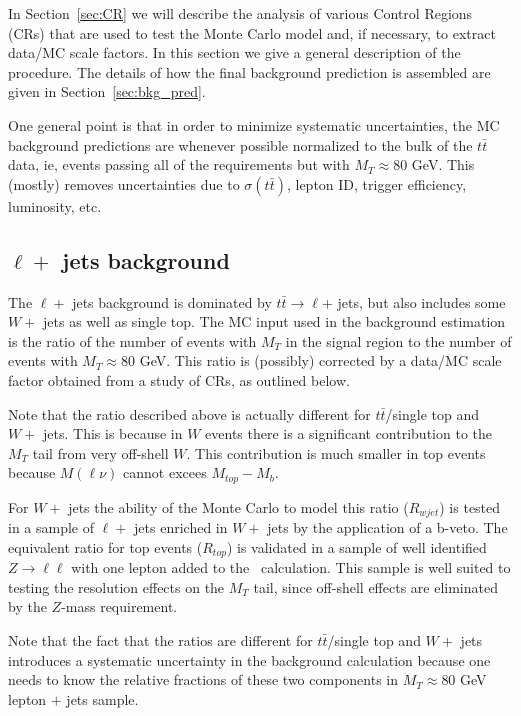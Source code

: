 In Section~\ref{sec:CR} we will describe the analysis of various Control Regions
(CRs)  that are used to test the Monte Carlo model and, if necessary,
to extract data/MC scale factors.  In this section we give a
general description of the procedure.  The details of how the
final background prediction is assembled are given in Section~\ref{sec:bkg_pred}.




One general point is that in order to minimize systematic uncertainties, the MC background
predictions are whenever possible normalized to the bulk of the $t\bar{t}$ data, ie, events passing all of the 
requirements but with $M_T \approx 80$ GeV.
This (mostly) removes uncertainties
due to $\sigma(t\bar{t})$, lepton ID, trigger efficiency, luminosity, etc.   

\subsection{$\ell +$ jets background}
\label{sec:ljbg-general}

The $\ell +$ jets background is dominated by 
$t\bar{t} \to \ell $+ jets, but also includes some $W +$ jets as well as single top.
The MC input used in the background estimation
is the ratio of the number of events with $M_T$ in the signal region
to the number of events with $M_T \approx 80$ GeV.
This ratio is (possibly) corrected by a data/MC scale factor obtained
from a study of CRs, as outlined below.

Note that the ratio described above is actually different for 
$t\bar{t}$/single top and $W +$ jets.  This is because in $W$ events
there is a significant contribution to the $M_T$ tail from very off-shell
$W$.
This contribution is much smaller in top events because $M(\ell \nu)$
cannot excees $M_{top}-M_b$.

For $W +$ jets the ability of the Monte Carlo to model this ratio
($R_{wjet}$) is tested in a sample of $\ell +$ jets enriched in 
$W +$ jets by the application of a b-veto.
The equivalent ratio for top events ($R_{top}$) is validated in a sample of well
identified $Z \to \ell \ell$ with one lepton added to the \met\
calculation.
This sample is well suited to testing the resolution effects on 
the $M_T$ tail, since off-shell effects are eliminated by the $Z$-mass
requirement.

Note that the fact that the ratios are different for 
$t\bar{t}$/single top and $W +$ jets introduces a systematic
uncertainty in the background calculation because one needs
to know the relative fractions of these two components in 
$M_T \approx 80$ GeV lepton $+$ jets sample.


